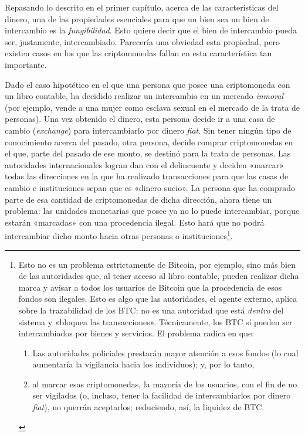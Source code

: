 \documentclass[12pt,a4paper,twoside]{book}
\begin{document}
Repasando lo descrito en el primer capítulo, acerca de las características del dinero, una de las propiedades esenciales para que un bien sea un bien de intercambio es la \textit{fungibilidad}. Esto quiere decir que el bien de intercambio pueda ser, justamente, intercambiado. Parecería una obviedad esta propiedad, pero existen casos en los que las criptomonedas fallan en esta característica tan importante.

Dado el caso hipotético en el que una persona que posee una criptomoneda con un libro contable, ha decidido realizar un intercambio en un mercado \textit{inmoral} (por ejemplo, vende a una mujer como esclava sexual en el mercado de la trata de personas). Una vez obtenido el dinero, esta persona decide ir a una casa de cambio (\textit{exchange}) para intercambiarlo por dinero \textit{fiat}. Sin tener ningún tipo de conocimiento acerca del pasado, otra persona, decide comprar criptomonedas en el que, parte del pasado de ese monto, se destinó para la trata de personas. Las autoridades internacionales logran dan con el delincuente y deciden «marcar» todas las direcciones en la que ha realizado transacciones para que las casas de cambio e instituciones sepan que es «dinero sucio». La persona que ha comprado parte de esa cantidad de criptomonedas de dicha dirección, ahora tiene un problema: las unidades monetarias que posee ya no lo puede intercambiar, porque estarán «marcadas» con una procedencia ilegal. Esto hará que no podrá intercambiar dicho monto hacia otras personas o instituciones\footnote{Esto no es un problema estrictamente de Bitcoin, por ejemplo, sino más bien de las autoridades que, al tener acceso al libro contable, pueden realizar dicha marca y avisar a todos los usuarios de Bitcoin que la procedencia de esos fondos son ilegales. Esto es algo que las autoridades, el agente externo, aplica sobre la trazabilidad de los BTC: no es una autoridad que está \textit{dentro} del sistema y «bloquea las transacciones». Técnicamente, los BTC sí pueden ser intercambiados por bienes y servicios. El problema radica en que: 

\begin{enumerate}
\item Las autoridades policiales prestarán mayor atención a esos fondos (lo cual aumentaría la vigilancia hacia los individuos); y, por lo tanto,
\item al marcar esas criptomonedas, la mayoría de los usuarios, con el fin de no ser vigilados (o, incluso, tener la facilidad de intercambiarlos por dinero \textit{fiat}), no querrán aceptarlos; reduciendo, así, la liquidez de BTC.
\end{enumerate}

}.
\end{document}
